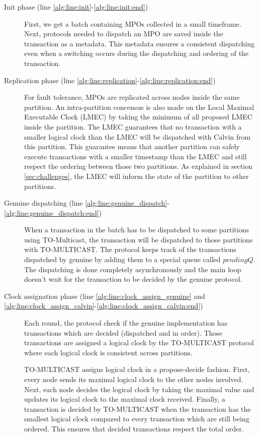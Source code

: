 \documentclass[a4paper, 10pt]{article}
\newcommand{\GE}{TO-Multicast}
\newcommand{\PE}{Calvin}
\newcommand{\Ch}[1]{\mynote{Ch}{#1}{green}}
\begin{document}
\begin{description}
    \item[Init phase (line \ref{alg:line:init}-\ref{alg:line:init:end})] First, we get a batch containing MPOs collected in
        a small timeframe. Next, protocols needed to dispatch an MPO are saved inside the transaction as a metadata.
        This metadata ensures a consistent dispatching even when a switching occurs during the dispatching and ordering
        of the transaction.

    \item[Replication phase (line \ref{alg:line:replication}-\ref{alg:line:replication:end})]
        For fault tolerance, MPOs are replicated across nodes inside the same
        partition. An intra-partition concensus is also made on the Local
        Maximal Executable Clock (LMEC) by taking the minimum of all proposed
        LMEC inside the partition. The LMEC guarantees that no transaction with a
        smaller logical clock than the LMEC will be dispatched with \PE{} from this partition.
        This guarantee means that another partition can safely execute transactions
        with a smaller timestamp than the LMEC and still respect the ordering between those
        two partitions. As explained in section \ref{sec:challenges}, the LMEC will inform
        the state of the partition to other partitions.

    \item[Genuine dispatching (line \ref{alg:line:genuine_dispatch}-\ref{alg:line:genuine_dispatch:end})]
        When a transaction in the batch has to be dispatched to some partitions using \GE, the transaction will be dispatched
        to those partitions with TO-MULTICAST. The protocol keeps track of the transactions dispatched by genuine
        by adding them to a special queue
        called $pendingQ$. The dispatching is done completely asynchronously and the main loop
        doesn't wait for the transaction to be decided by the genuine protocol.

    \item[Clock assignation phase (line \ref{alg:line:clock_assign_genuine} and \ref{alg:line:clock_assign_calvin}-\ref{alg:line:clock_assign_calvin:end})]
        Each round, the protocol check if the genuine implementation has transactions which are decided (dispatched and
        in order). Those transactions are assigned a logical clock by the TO-MULTICAST protocol
        where each logical clock is consistent across partitions.

        TO-MULTICAST assigns logical clock in a propose-decide fashion. First, every node sends its maximal logical clock
        to the other nodes involved. Next, each node decides the logical clock by taking the maximal value and updates
        its logical clock to the maximal clock received.
        Finally, a transaction is decided by TO-MULTICAST when the transaction has the smallest logical clock
        compared to every transaction which are still being ordered. This ensures that decided transactions respect the total
        order. %


\end{description}
\end{document}
